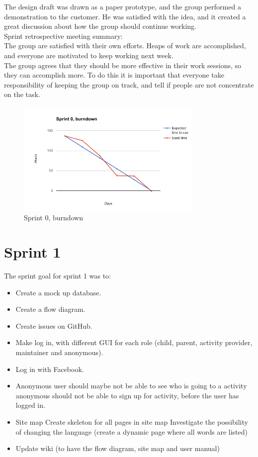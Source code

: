 The design draft was drawn as a paper prototype, and the group performed a demonstration to the customer. He was satisfied with the idea, and it created a great discussion about how the group should continue working. \\

Sprint retrospective meeting summary:\\
The group are satisfied with their own efforts. Heaps of work are accomplished, and everyone are motivated to keep working next week. \\
    
The group agrees that they should be more effective in their work sessions, so they can accomplish more. To do this it is important that everyone take responsibility of keeping the group on track, and tell if people are not concentrate on the task.

\begin{figure}[h!]
\centering
    \includegraphics[width=0.8\textwidth]{fig/sprint0}
\caption{Sprint 0, burndown}
\end{figure}



\section{Sprint 1}
The sprint goal for sprint 1 was to: 
\begin{itemize}
  \item Create a mock up database.
  \item Create a flow diagram.
  \item Create issues on GitHub.
  \item Make log in, with different GUI for each role (child, parent, activity      provider, maintainer and anonymous).
  \item Log in with Facebook.
  \item Anonymous user should maybe not be able to see who is going to a activity anonymous should not be able to sign up for activity, before the user has logged in.
  \item  Site map Create skeleton for all pages in site map Investigate the possibility of changing the language (create a dynamic page where all words are listed)
  \item Update wiki (to have the flow diagram, site map and user manual)
\end{itemize}
 
